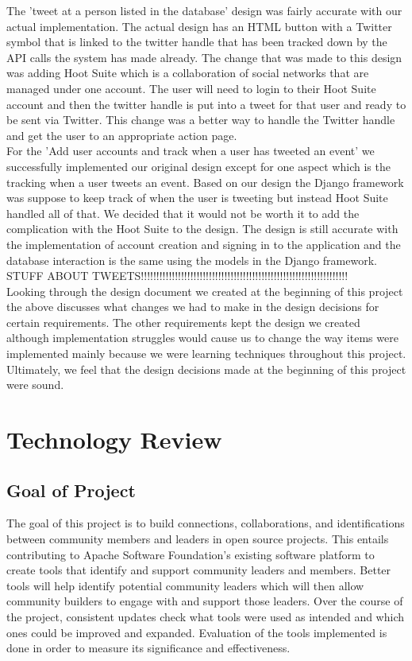 \documentclass[draftclsnofoot,10pt,onecolumn]{IEEEtran} %
\begin{document}
The 'tweet at a person listed in the database' design was fairly accurate with our actual implementation. The actual design has an HTML button with a Twitter symbol that is linked to the twitter handle that has been tracked down by the API calls the system has made already. The change that was made to this design was adding Hoot Suite which is a collaboration of social networks that are managed under one account. The user will need to login to their Hoot Suite account and then the twitter handle is put into a tweet for that user and ready to be sent via Twitter. This change was a better way to handle the Twitter handle and get the user to an appropriate action page. \\

For the 'Add user accounts and track when a user has tweeted an event' we successfully implemented our original design except for one aspect which is the tracking when a user tweets an event. Based on our design the Django framework was suppose to keep track of when the user is tweeting but instead Hoot Suite handled all of that. We decided that it would not be worth it to add the complication with the Hoot Suite to the design. The design is still accurate with the implementation of account creation and signing in to the application and the database interaction is the same using the models in the Django framework. \\

STUFF ABOUT TWEETS!!!!!!!!!!!!!!!!!!!!!!!!!!!!!!!!!!!!!!!!!!!!!!!!!!!!!!!!!!!!!!!!!!! \\

Looking through the design document we created at the beginning of this project the above discusses what changes we had to make in the design decisions for certain requirements. The other requirements kept the design we created although implementation struggles would cause us to change the way items were implemented mainly because we were learning techniques throughout this project. Ultimately, we feel that the design decisions made at the beginning of this project were sound.

\section{Technology Review}

\subsection{Goal of Project} 
The goal of this project is to build connections, collaborations, and identifications between community members and leaders
in open source projects. This entails contributing to Apache Software Foundation’s existing software platform to create tools
that identify and support community leaders and members. Better tools will help identify potential community leaders which
will then allow community builders to engage with and support those leaders. Over the course of the project, consistent
updates check what tools were used as intended and which ones could be improved and expanded. Evaluation of the tools
implemented is done in order to measure its significance and effectiveness. \\
\end{document}

